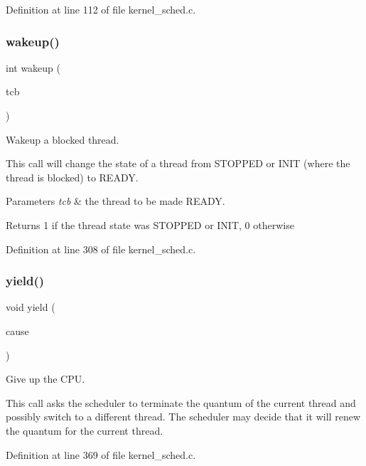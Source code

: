 Definition at line 112 of file kernel\+\_\+sched.\+c.

\mbox{\label{group__scheduler_gae8301452fd9ae5bf7cd7f2676650ff06}} 
\subsubsection{\texorpdfstring{wakeup()}{wakeup()}}
{\footnotesize\ttfamily int wakeup (\begin{DoxyParamCaption}\item[{\hyperlink{group__scheduler_gaf88d9c946bf70b36a1e8bc34383abfc9}{T\+CB} $\ast$}]{tcb }\end{DoxyParamCaption})}



Wakeup a blocked thread. 

This call will change the state of a thread from {\ttfamily S\+T\+O\+P\+P\+ED} or {\ttfamily I\+N\+IT} (where the thread is blocked) to {\ttfamily R\+E\+A\+DY}.


\begin{DoxyParams}{Parameters}
{\em tcb} & the thread to be made {\ttfamily R\+E\+A\+DY}. \\
\hline
\end{DoxyParams}
\begin{DoxyReturn}{Returns}
1 if the thread state was {\ttfamily S\+T\+O\+P\+P\+ED} or {\ttfamily I\+N\+IT}, 0 otherwise 
\end{DoxyReturn}


Definition at line 308 of file kernel\+\_\+sched.\+c.

\mbox{\label{group__scheduler_ga1db327892199949812ae5a52119f2e97}} 
\subsubsection{\texorpdfstring{yield()}{yield()}}
{\footnotesize\ttfamily void yield (\begin{DoxyParamCaption}\item[{enum \hyperlink{group__scheduler_gaad787d8d80312ffca3c0f197b3a25fbe}{S\+C\+H\+E\+D\+\_\+\+C\+A\+U\+SE}}]{cause }\end{DoxyParamCaption})}



Give up the C\+PU. 

This call asks the scheduler to terminate the quantum of the current thread and possibly switch to a different thread. The scheduler may decide that it will renew the quantum for the current thread. 

Definition at line 369 of file kernel\+\_\+sched.\+c.

